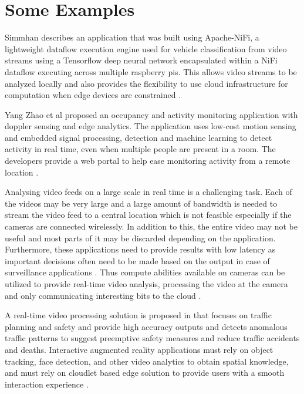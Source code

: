\documentclass[sigconf]{acmart}
\begin{document}
\section{Some Examples}

Simmhan describes an application that was built using Apache-NiFi, a lightweight dataflow execution engine used for vehicle classification from video streams using a Tensorflow deep neural network encapsulated within a NiFi dataflow executing across multiple raspberry pis. This allows video streams to be analyzed locally and also provides the flexibility to use cloud infrastructure for computation when edge devices are constrained \cite{ieee-iot-cloud-analytics-newsletter}.

Yang Zhao et al proposed an occupancy and activity monitoring application with doppler sensing and edge analytics. The application uses low-cost motion sensing and embedded signal processing, detection and machine learning to detect activity in real time, even when multiple people are present in a room. The developers provide a web portal to help ease monitoring activity from a remote location \cite{Dolppler-usecase}.

Analysing video feeds on a large scale in real time is a challenging task. Each of the videos may be very large and a large amount of bandwidth is needed to stream the video feed to a central location which is not feasible especially if the cameras are connected wirelessly. In addition to this, the entire video may not be useful and most parts of it may be discarded depending on the application. Furthermore, these applications need to provide results with low latency as important decisions often need to be made based on the output in case of surveillance applications \cite{rocket-real-time-video}. Thus compute abilities available on cameras can be utilized to provide real-time video analysis, processing the video at the camera and only communicating interesting bits to the cloud \cite{satyanarayananemergence}.

A real-time video processing solution is proposed in \cite{rocket-real-time-video} that focuses on traffic planning and safety and provide high accuracy outputs and detects anomalous traffic patterns to suggest preemptive safety measures and reduce traffic accidents and deaths.
Interactive augmented reality applications must rely on object tracking, face detection, and other video analytics to obtain spatial knowledge, and must rely on cloudlet based edge solution to provide users with a smooth interaction experience \cite{rocket-real-time-video}.
\end{document}
